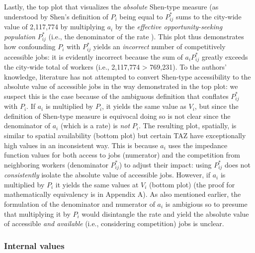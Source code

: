 \documentclass[10pt,letterpaper]{article}
\begin{document}
Lastly, the top plot that visualizes the \emph{absolute} Shen-type
measure (as understood by Shen's definition of \(P_i\) being equal to
\(P_{ij}^*\) sums to the city-wide value of 2,117,774 by multiplying
\(a_i\) by the \emph{effective opportunity-seeking population}
\(P_{ij}^*\) (i.e., the denominator of the rate ). This plot thus
demonstrates how confounding \(P_i\) with \(P_{ij}^*\) yields an
\emph{incorrect} number of competitively accessible jobs: it is
evidently incorrect because the sum of \(a_iP_{ij}^*\) greatly exceeds
the city-wide total of workers (i.e., 2,117,774 \textgreater{} 769,231).
To the authors' knowledge, literature has not attempted to convert
Shen-type accessibility to the absolute value of accessible jobs in the
way demonstrated in the top plot: we suspect this is the case because of
the ambiguous definition that conflates \(P_{ij}^*\) with \(P_i\). If
\(a_i\) is multiplied by \(P_i\), it yields the same value as \(V_i\),
but since the definition of Shen-type measure is equivocal doing so is
not clear since the denominator of \(a_i\) (which is a rate) is
\emph{not} \(P_i\). The resulting plot, spatially, is similar to spatial
availability (bottom plot) but certain TAZ have exceptionally high
values in an inconsistent way. This is because \(a_i\) uses the
impedance function values for both access to jobs (numerator) and the
competition from neighboring workers (denominator \(P_{ij}^*\)) to
adjust their impact: using \(P_{ij}^*\) does not \emph{consistently}
isolate the absolute value of accessible jobs. However, if \(a_i\) is
multiplied by \(P_i\) it yields the same values at \(V_i\) (bottom plot)
(the proof for mathematically equivalency is in Appendix A). As also
mentioned earlier, the formulation of the denominator and numerator of
\(a_i\) is ambigious so to presume that multiplying it by \(P_i\) would
disintangle the rate and yield the absolute value of accessible
\emph{and available} (i.e., considering competition) jobs is unclear.

\hypertarget{internal-values}{%
\subsubsection{Internal values}\label{internal-values}}
\end{document}
